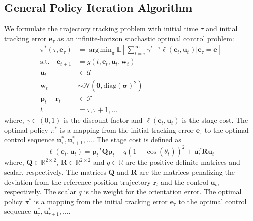 \documentclass[conference]{IEEEtran}
\DeclareMathOperator*{\argmin}{arg\,min}
\begin{document}
\subsection{General Policy Iteration Algorithm}
We formulate the trajectory tracking problem with initial time $\tau$ and initial tracking error $\mathbf{e}_\tau$ as an infinite-horizon stochastic optimal control problem:
\begin{align}\label{GPI}
    \pi^*(\tau, \mathbf{e}_\tau) &= \argmin_{\pi} \mathbb{E} \left[ \sum_{t=\tau}^\infty \gamma^{t-\tau} \ell(\mathbf{e}_t, \mathbf{u}_t) | \mathbf{e}_{\tau} = \mathbf{e} \right] \\
    \text{s.t.} \quad \mathbf{e}_{t+1} &= g(t, \mathbf{e}_t, \mathbf{u}_t, \mathbf{w}_t) \\
    \mathbf{u}_t &\in \mathcal{U} \\
    \mathbf{w}_t &\sim \mathcal{N}(\mathbf{0}, \text{diag}(\mathbf{\sigma})^2) \\
    \bar{\mathbf{p}_t} + \mathbf{r}_t &\in \mathcal{F} \\
    t &= \tau, \tau+1, \dots
\end{align}
where, $\gamma \in (0, 1)$ is the discount factor and $\ell(\mathbf{e}_t, \mathbf{u}_t)$ is the stage cost. The optimal policy $\pi^*$ is a mapping from the initial tracking error $\mathbf{e}_\tau$ to the optimal control sequence $\mathbf{u}_\tau^*, \mathbf{u}_{\tau+1}^*, \dots$.
The stage cost is defined as
\begin{equation}
    \ell(\mathbf{e}_t, \mathbf{u}_t) = \bar{\mathbf{p}_t}^{T} \mathbf{Q} \bar{\mathbf{p}_t} + q(1 -\cos(\bar{\theta}_t))^2 + \mathbf{u}_t^T \mathbf{R} \mathbf{u}_t
\end{equation}
where, $\mathbf{Q} \in \mathbb{R}^{2 \times 2}$, $\mathbf{R} \in \mathbb{R}^{2 \times 2}$ and $q \in \mathbb{R}$ are the positive definite matrices and scalar, respectively. The matrices $\mathbf{Q}$ and $\mathbf{R}$ are the matrices penalizing the deviation from the reference position trajectory $\mathbf{r}_t$ and the control $\mathbf{u}_t$, respectively. The scalar $q$ is the weight for the orientation error. The optimal policy $\pi^*$ is a mapping from the initial tracking error $\mathbf{e}_\tau$ to the optimal control sequence $\mathbf{u}_\tau^*, \mathbf{u}_{\tau+1}^*, \dots$.
\end{document}
